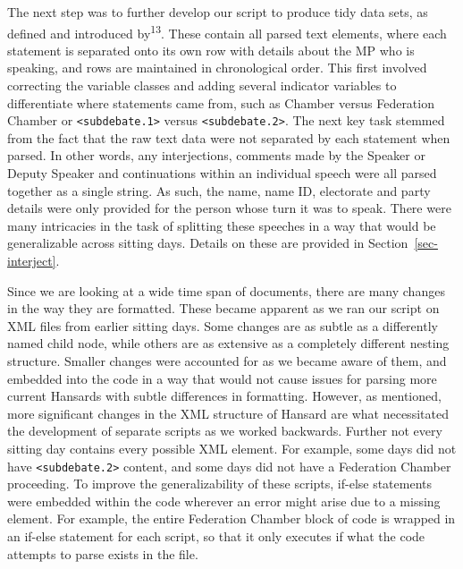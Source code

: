 \documentclass[
  letterpaper,
  DIV=11,
  numbers=noendperiod]{scrartcl}
\begin{document}
The next step was to further develop our script to produce tidy data
sets, as defined and introduced by\textsuperscript{13}. These contain
all parsed text elements, where each statement is separated onto its own
row with details about the MP who is speaking, and rows are maintained
in chronological order. This first involved correcting the variable
classes and adding several indicator variables to differentiate where
statements came from, such as Chamber versus Federation Chamber or
\texttt{\textless{}subdebate.1\textgreater{}} versus
\texttt{\textless{}subdebate.2\textgreater{}}. The next key task stemmed
from the fact that the raw text data were not separated by each
statement when parsed. In other words, any interjections, comments made
by the Speaker or Deputy Speaker and continuations within an individual
speech were all parsed together as a single string. As such, the name,
name ID, electorate and party details were only provided for the person
whose turn it was to speak. There were many intricacies in the task of
splitting these speeches in a way that would be generalizable across
sitting days. Details on these are provided in
Section~\ref{sec-interject}.

Since we are looking at a wide time span of documents, there are many
changes in the way they are formatted. These became apparent as we ran
our script on XML files from earlier sitting days. Some changes are as
subtle as a differently named child node, while others are as extensive
as a completely different nesting structure. Smaller changes were
accounted for as we became aware of them, and embedded into the code in
a way that would not cause issues for parsing more current Hansards with
subtle differences in formatting. However, as mentioned, more
significant changes in the XML structure of Hansard are what
necessitated the development of separate scripts as we worked backwards.
Further not every sitting day contains every possible XML element. For
example, some days did not have
\texttt{\textless{}subdebate.2\textgreater{}} content, and some days did
not have a Federation Chamber proceeding. To improve the
generalizability of these scripts, if-else statements were embedded
within the code wherever an error might arise due to a missing element.
For example, the entire Federation Chamber block of code is wrapped in
an if-else statement for each script, so that it only executes if what
the code attempts to parse exists in the file.
\end{document}

